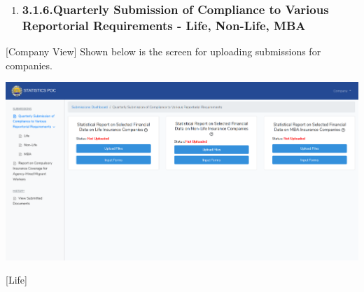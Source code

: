 \documentclass{article}
\begin{document}
\begin{enumerate}
\item{}
\subsubsection{3.1.6.\hspace*{0.5em}Quarterly Submission of Compliance to Various Reportorial Requirements - Life, Non-Life, MBA}\label{sec-quarterly-submission-of-compliance-to-various-reportorial-requirements---life-non-life-mba}%
\end{enumerate}%

\noindent{}[Company View] Shown below is the screen for
uploading submissions for companies.%

\includegraphics[keepaspectratio=true]{up-ic-screens/image178}{}%

[Life]%
\end{document}
